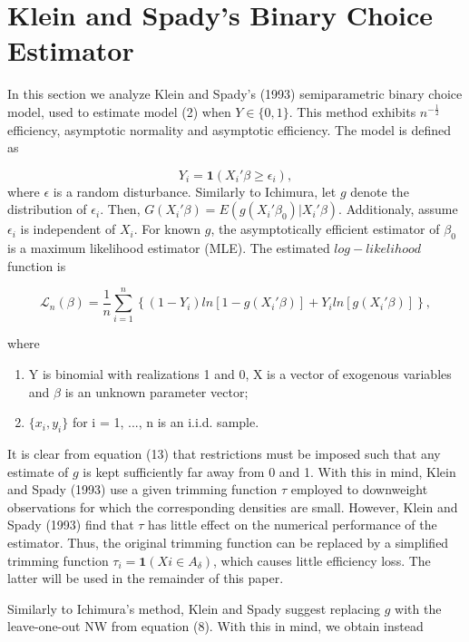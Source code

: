 \documentclass[a4paper]{article}
\begin{document}
\section{Klein and Spady's Binary Choice Estimator} %
\label{sec:section_about_references_within_the_document}
In this section we analyze Klein and Spady's (1993) semiparametric binary choice model, used to estimate model (2) when $Y \in \{0,1\}$.   This method exhibits $n^{-\frac{1}{2}}$ efficiency, asymptotic normality and asymptotic efficiency. The model is defined as

\begin{equation}
Y_i =  \mathbf{1}{(X_i'\beta \geq \epsilon_i)},
\end{equation}
where $\epsilon$ is a random disturbance. Similarly to Ichimura, let $g$ denote the distribution of $\epsilon_i$. Then, $G(X_i'\beta) = E(g(X_i'\beta_0)|X_i'\beta)$. Additionaly, assume $\epsilon_i$ is independent of $X_i$. For known $g$, the asymptotically efficient estimator of $\beta_0$ is a maximum likelihood estimator (MLE). The estimated $log-likelihood$ function is

\begin{equation}
\mathcal{L}_n(\beta) = \frac{1}{n}\sum_{i=1}^n \left\{ (1 - Y_i)ln[ 1 - g(X_i'\beta)] + Y_iln[g(X_i'\beta)] \right\},
\end{equation}

where

\begin{enumerate}[label=(\roman*)]
		\item Y is binomial with realizations 1 and 0, X is a vector of exogenous variables and $\beta$ is an unknown parameter vector;
		\item $\{x_i,y_i\}$ for i = 1, ..., n is an i.i.d. sample.
\end{enumerate}

It is clear from equation (13) that restrictions must be imposed such that any estimate of $g$ is kept sufficiently far away from 0 and 1. With this in mind, Klein and Spady (1993) use a given trimming function $\tau$ employed to downweight observations for which the corresponding densities are small. However, Klein and Spady (1993) find that $\tau$ has little effect on the numerical performance of the estimator. Thus, the original trimming function can be replaced by a simplified trimming function $\tau_i = \mathbf{1}{(Xi \in A_\delta)}$, which causes little efficiency loss. The latter will be used in the remainder of this paper.

Similarly to Ichimura's method, Klein and Spady suggest replacing $g$ with the leave-one-out NW from equation (8). With this in mind, we obtain instead
\end{document}
